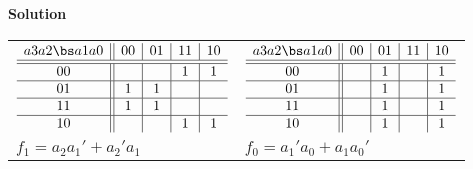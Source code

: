 \begin{enumerate}
\begin{itemize}
                \begin{onlysolution}  \textbf{Solution} \itshape{
                        \begin{tabular}{ll}
                            $
                            \begin{array} {c||c|c|c|c}
                                a3 a2 \bs a1 a0 & 00 & 01 & 11 & 10 \\ \hline \hline
                                00        &    &    & 1  & 1  \\ \hline
                                01        & 1  & 1  &    &    \\ \hline
                                11        & 1  & 1  &    &    \\ \hline
                                10        &    &    & 1  & 1  \\
                            \end{array}$ &
                            $
                            \begin{array} {c||c|c|c|c}
                                a3 a2 \bs a1 a0 & 00 & 01 & 11 & 10 \\ \hline \hline
                                00        &    & 1  &    & 1  \\ \hline
                                01        &    & 1  &    & 1  \\ \hline
                                11        &    & 1  &    & 1  \\ \hline
                                10        &    & 1  &    & 1  \\
                            \end{array}$ \\
                            $f_1 = a_2a_1'+a_2'a_1$ & $f_0 = a_1'a_0+a_1a_0'$ \\
                        \end{tabular}
                    }
                \end{onlysolution}


\end{itemize}
\end{enumerate}
